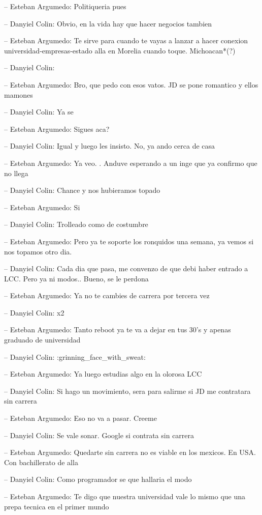 -- Esteban Argumedo: Politiqueria pues

-- Danyiel Colin: Obvio, en la vida hay que hacer negocios tambien

-- Esteban Argumedo: Te sirve para cuando te vayas a lanzar a hacer
conexion universidad-empresas-estado alla en Morelia cuando toque.
Michoacan*(?)

-- Danyiel Colin:

-- Esteban Argumedo: Bro, que pedo con esos vatos. JD se pone romantico
y ellos mamones

-- Danyiel Colin: Ya se

-- Esteban Argumedo: Sigues aca?

-- Danyiel Colin: Igual y luego les insisto. No, ya ando cerca de casa

-- Esteban Argumedo: Ya veo. . Anduve esperando a un inge que ya
confirmo que no llega

-- Danyiel Colin: Chance y nos hubieramos topado

-- Esteban Argumedo: Si

-- Danyiel Colin: Trolleado como de costumbre

-- Esteban Argumedo: Pero ya te soporte los ronquidos una semana, ya
vemos si nos topamos otro dia.

-- Danyiel Colin: Cada dia que pasa, me convenzo de que debi haber
entrado a LCC. Pero ya ni modos.. Bueno, se le perdona

-- Esteban Argumedo: Ya no te cambies de carrera por tercera vez

-- Danyiel Colin: x2

-- Esteban Argumedo: Tanto reboot ya te va a dejar en tus 30's y apenas
graduado de universidad

-- Danyiel Colin: :grinning\_face\_with\_sweat:

-- Esteban Argumedo: Ya luego estudias algo en la olorosa LCC

-- Danyiel Colin: Si hago un movimiento, sera para salirme si JD me
contratara sin carrera

-- Esteban Argumedo: Eso no va a pasar. Creeme

-- Danyiel Colin: Se vale sonar. Google si contrata sin carrera

-- Esteban Argumedo: Quedarte sin carrera no es viable en los mexicos.
En USA. Con bachillerato de alla

-- Danyiel Colin: Como programador se que hallaria el modo

-- Esteban Argumedo: Te digo que nuestra universidad vale lo mismo que
una prepa tecnica en el primer mundo

